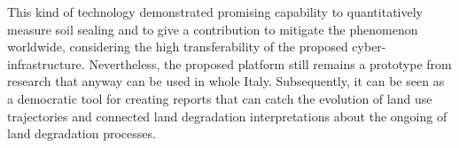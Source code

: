 \documentclass[APA,LATO1COL,doublespace]{WileyNJD-v2}
\newcommand{\toberevised}[1]{\emph{\textcolor{red}{#1}}} %
\begin{document}
This kind of technology demonstrated promising capability to quantitatively measure soil sealing and to give a contribution to mitigate the %
phenomenon worldwide, considering the high transferability of the proposed cyber-infrastructure.
%
Nevertheless, the proposed platform still remains a prototype from research that anyway can be used in whole Italy. 
Subsequently, it can be seen as a democratic tool for creating reports that can catch the evolution of land use trajectories and connected land degradation interpretations about the ongoing of land degradation processes.


\end{document}
